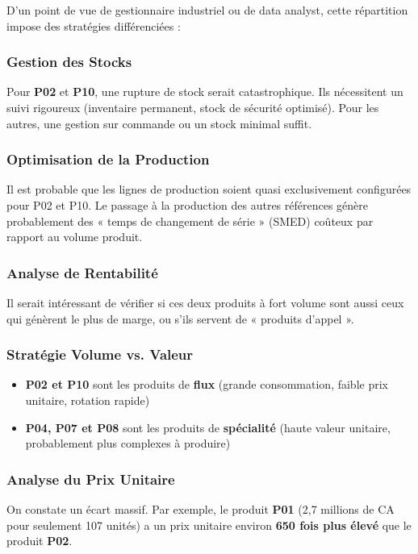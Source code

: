 \documentclass[11pt,a4paper]{article}
\begin{document}
D'un point de vue de gestionnaire industriel ou de data analyst, cette répartition impose des stratégies différenciées :

\subsubsection{Gestion des Stocks}
Pour \textbf{P02} et \textbf{P10}, une rupture de stock serait catastrophique. Ils nécessitent un suivi rigoureux (inventaire permanent, stock de sécurité optimisé). Pour les autres, une gestion sur commande ou un stock minimal suffit.

\subsubsection{Optimisation de la Production}
Il est probable que les lignes de production soient quasi exclusivement configurées pour P02 et P10. Le passage à la production des autres références génère probablement des « temps de changement de série » (SMED) coûteux par rapport au volume produit.

\subsubsection{Analyse de Rentabilité}
Il serait intéressant de vérifier si ces deux produits à fort volume sont aussi ceux qui génèrent le plus de marge, ou s'ils servent de « produits d'appel ».

\subsubsection{Stratégie Volume vs. Valeur}
\begin{itemize}[leftmargin=*,itemsep=0.3em]
  \item \textbf{P02 et P10} sont les produits de \textbf{flux} (grande consommation, faible prix unitaire, rotation rapide)
  \item \textbf{P04, P07 et P08} sont les produits de \textbf{spécialité} (haute valeur unitaire, probablement plus complexes à produire)
\end{itemize}

\subsubsection{Analyse du Prix Unitaire}
On constate un écart massif. Par exemple, le produit \textbf{P01} (2,7 millions de CA pour seulement 107 unités) a un prix unitaire environ \textbf{650 fois plus élevé} que le produit \textbf{P02}.
\end{document}
